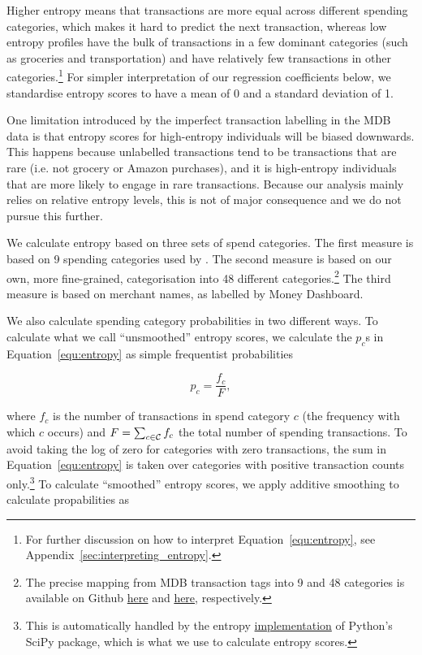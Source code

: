 Higher entropy means that transactions are more equal across different spending
categories, which makes it hard to predict the next transaction, whereas low
entropy profiles have the bulk of transactions in a few dominant categories
(such as groceries and transportation) and have relatively few transactions in
other categories.\footnote{For further discussion on how to interpret
Equation~\ref{equ:entropy}, see Appendix~\ref{sec:interpreting_entropy}.} For
simpler interpretation of our regression coefficients below, we standardise
entropy scores to have a mean of 0 and a standard deviation of 1.

One limitation introduced by the imperfect transaction labelling in the
MDB data is that entropy scores for high-entropy individuals will be biased
downwards. This happens because unlabelled transactions tend to be transactions
that are rare (i.e. not grocery or Amazon purchases), and it is high-entropy
individuals that are more likely to engage in rare transactions. Because our
analysis mainly relies on relative entropy levels, this is not of major
consequence and we do not pursue this further.

We calculate entropy based on three sets of spend categories. The first measure
is based on 9 spending categories used by \citet{muggleton2020evidence}. The
second measure is based on our own, more fine-grained, categorisation into 48
different categories.\footnote{The precise mapping from MDB transaction tags
    into 9 and 48 categories is available on Github
    \href{https://github.com/fabiangunzinger/entropy/blob/7fa9c565bf8959ea92a9d4fe2245da0864e19c27/src/data/txn_classifications.py\#L249}{here}
    and
    \href{https://github.com/fabiangunzinger/entropy/blob/7fa9c565bf8959ea92a9d4fe2245da0864e19c27/src/data/txn_classifications.py\#L503}{here},
respectively.} The third measure is based on merchant names, as labelled by
Money Dashboard.

We also calculate spending category probabilities in two different ways. To
calculate what we call ``unsmoothed'' entropy scores, we calculate the $p_c$s
in Equation~\ref{equ:entropy} as simple frequentist probabilities

\begin{equation}
    p_c = \frac{f_c}{F},
\end{equation}

\noindent where $f_c$ is the number of transactions in spend category $c$ (the
frequency with which $c$ occurs) and $F = \sum_{c \in \mathcal{C}}f_c$ the total
number of spending transactions. To avoid taking the log of zero for categories
with zero transactions, the sum in Equation~\ref{equ:entropy} is taken over
categories with positive transaction counts only.\footnote{This is
    automatically handled by the entropy
    \href{https://docs.scipy.org/doc/scipy/reference/generated/scipy.stats.entropy.html}{implementation}
of Python's SciPy package, which is what we use to calculate entropy scores.}
To calculate ``smoothed'' entropy scores, we apply additive smoothing to
calculate propabilities as


